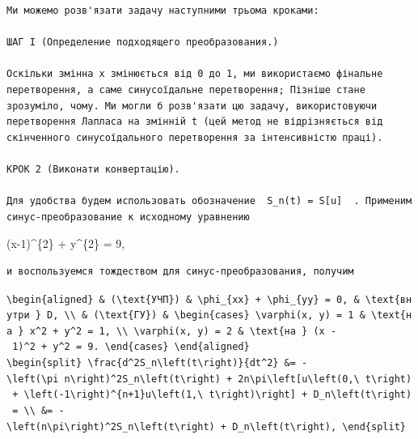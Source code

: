 \documentclass[
  ukrainian,
]{article}
\begin{document}
\begin{verbatim}
Ми можемо розв'язати задачу наступними трьома кроками:

ШАГ І (Определение подходящего преобразования.)

Оскільки змінна x змінюється від 0 до 1, ми використаємо фінальне перетворення, а саме синусоїдальне перетворення; Пізніше стане зрозуміло, чому. Ми могли б розв'язати цю задачу, використовуючи перетворення Лапласа на змінній t (цей метод не відрізняється від скінченного синусоїдального перетворення за інтенсивністю праці).

КРОК 2 (Виконати конвертацію).

Для удобства будем использовать обозначение  S_n(t) = S[u]  . Применим синус-преобразование к исходному уравнению
\end{verbatim}

(x-1)\^{}\{2\} + y\^{}\{2\} = 9,

\begin{verbatim}
и воспользуемся тождеством для синус-преобразования, получим
\end{verbatim}

\texttt{\textbackslash{}begin\{aligned\}\ \&\ (\textbackslash{}text\{УЧП\})\ \&\ \textbackslash{}phi\_\{xx\}\ +\ \textbackslash{}phi\_\{yy\}\ =\ 0,\ \&\ \textbackslash{}text\{внутри\ \}\ D,\ \textbackslash{}\textbackslash{}\ \&\ (\textbackslash{}text\{ГУ\})\ \&\ \textbackslash{}begin\{cases\}\ \textbackslash{}varphi(x,\ y)\ =\ 1\ \&\ \textbackslash{}text\{на\ \}\ x\^{}2\ +\ y\^{}2\ =\ 1,\ \textbackslash{}\textbackslash{}\ \textbackslash{}varphi(x,\ y)\ =\ 2\ \&\ \textbackslash{}text\{на\ \}\ (x\ -\ 1)\^{}2\ +\ y\^{}2\ =\ 9.\ \textbackslash{}end\{cases\}\ \textbackslash{}end\{aligned\}}
\texttt{\textbackslash{}begin\{split\}\ \textbackslash{}frac\{d\^{}2S\_n\textbackslash{}left(t\textbackslash{}right)\}\{dt\^{}2\}\ \&=\ -\textbackslash{}left(\textbackslash{}pi\ n\textbackslash{}right)\^{}2S\_n\textbackslash{}left(t\textbackslash{}right)\ +\ 2n\textbackslash{}pi\textbackslash{}left{[}u\textbackslash{}left(0,\textbackslash{}\ t\textbackslash{}right)\ +\ \textbackslash{}left(-1\textbackslash{}right)\^{}\{n+1\}u\textbackslash{}left(1,\textbackslash{}\ t\textbackslash{}right)\textbackslash{}right{]}\ +\ D\_n\textbackslash{}left(t\textbackslash{}right)\ =\ \textbackslash{}\textbackslash{}\ \&=\ -\textbackslash{}left(n\textbackslash{}pi\textbackslash{}right)\^{}2S\_n\textbackslash{}left(t\textbackslash{}right)\ +\ D\_n\textbackslash{}left(t\textbackslash{}right),\ \textbackslash{}end\{split\}}
\end{document}
